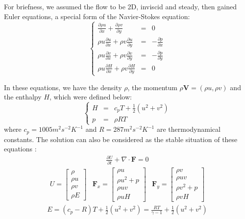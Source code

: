 \documentclass[%
 reprint,
 amsmath,amssymb,
pra,
]{revtex4-1}
\begin{document}
For briefness, we assumed the flow to be 2D, inviscid and steady, then gained Euler equations, a special form of the Navier-Stokes equation:
\begin{equation}
\left\{
\begin{array}{ccc}
	\frac{\partial \rho u}{\partial x} + \frac{\partial \rho v}{\partial y} & = & 0\\
	\rho u \frac{\partial u}{\partial x} + \rho v \frac{\partial u}{\partial y} & = & -\frac{\partial p}{\partial x}\\
	\rho u \frac{\partial v}{\partial x} + \rho v \frac{\partial v}{\partial y} & = & -\frac{\partial p}{\partial y}\\
	\rho u \frac{\partial H}{\partial x} + \rho v \frac{\partial H}{\partial y} & = & 0
\end{array}
\right.
\end{equation}

In these equations, we have the density $\rho$, the momentum $\rho\bm{V}=\left(\rho u, \rho v\right)$ and the enthalpy $H$, which were defined below:
\begin{equation}
\left\{
\begin{array}{ccc}
	H & = & c_p T + \frac{1}{2}\left(u^2 + v^2\right)\\
	p & = & \rho R T
\end{array}
\right.
\end{equation}
where $c_p = 1005 m^2 s^{-2} K^{-1}$ and $R = 287 m^2 s^{-2} K^{-1}$ are thermodynamical constants. The solution can also be considered as the stable situation of these equations \cite{hirsch2007numerical}:
\begin{align}\label{eq:differential_equation}
	\frac{\partial U}{\partial t} + \nabla \cdot \bm{F} = 0
\end{align}
\begin{equation}
\begin{array}{ccc}
U = \left[
\begin{array}{c}
\rho\\
\rho u\\
\rho v\\
\rho E
\end{array}
\right]
&
\bm{F}_x = \left[
\begin{array}{c}
\rho u\\
\rho u^2 + p\\
\rho u v\\
\rho u H
\end{array}
\right]
&
\bm{F}_y = \left[
\begin{array}{c}
\rho v\\
\rho u v\\
\rho v^2 + p\\
\rho v H
\end{array}
\right]
\end{array}
\end{equation}
\begin{align}
	E = \left(c_p - R\right) T + \frac{1}{2}\left(u^2 + v^2\right) = \frac{R T}{\gamma - 1} + \frac{1}{2}\left(u^2 + v^2\right)
\end{align}
\end{document}

